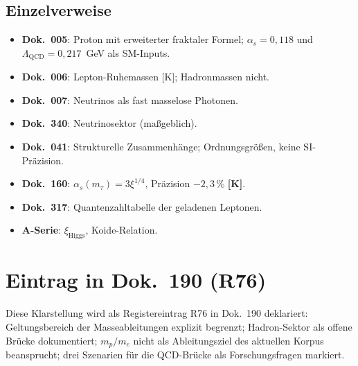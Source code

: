 \subsection{Einzelverweise}

\begin{itemize}
  \item \textbf{Dok.~005}: Proton mit erweiterter fraktaler Formel;
    $\alpha_s = 0{,}118$ und $\Lambda_{\mathrm{QCD}} = 0{,}217$~GeV
    als SM-Inputs.
  \item \textbf{Dok.~006}: Lepton-Ruhemassen [K]; Hadronmassen nicht.
  \item \textbf{Dok.~007}: Neutrinos als fast masselose Photonen.
  \item \textbf{Dok.~340}: Neutrinosektor (maßgeblich).
  \item \textbf{Dok.~041}: Strukturelle Zusammenhänge; Ordnungsgrößen,
    keine SI-Präzision.
  \item \textbf{Dok.~160}: $\alpha_s(m_\tau) = 3\xi^{1/4}$,
    Präzision $-2{,}3\,\%$ \textbf{[K]}.
  \item \textbf{Dok.~317}: Quantenzahltabelle der geladenen Leptonen.
  \item \textbf{A-Serie}: $\xi_{\mathrm{Higgs}}$, Koide-Relation.
\end{itemize}

\section{Eintrag in Dok.~190 (R76)}

Diese Klarstellung wird als Registereintrag R76 in Dok.~190 deklariert:
Geltungsbereich der Masseableitungen explizit begrenzt; Hadron-Sektor
als offene Brücke dokumentiert; $m_p/m_e$ nicht als Ableitungsziel des
aktuellen Korpus beansprucht; drei Szenarien für die QCD-Brücke als
Forschungsfragen markiert.
